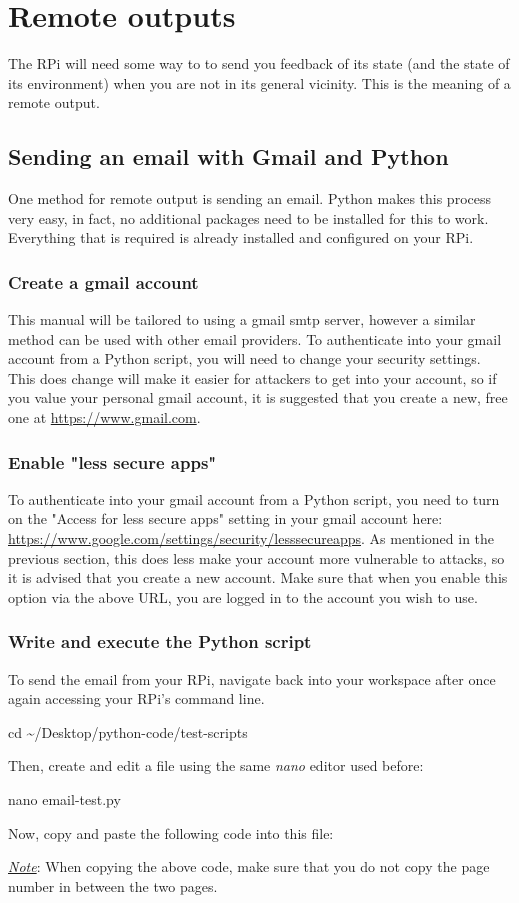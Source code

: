 \documentclass{article}
\newcommand*{\myfont}{\fontfamily{pcr}\selectfont}
\newcommand{\codeb}[2]{
  \begin{tcolorbox}[width=\textwidth,colback={SpringGreen},title={#1},colbacktitle=DarkGreen,coltitle=SpringGreen]
    \myfont
    #2
  \end{tcolorbox}
} %
\newcommand{\note}[1]{\underline{\textit{Note}}: #1}
\begin{document}
\section{Remote outputs}
The RPi will need some way to to send you feedback of its state (and the state of its environment) when you are not in its general vicinity. This is the meaning of a remote output.
  \subsection{Sending an email with Gmail and Python}
  One method for remote output is sending an email. Python makes this process very easy, in fact, no additional packages need to be installed for this to work. Everything that is required is already installed and configured on your RPi.
    \subsubsection{Create a gmail account}
    This manual will be tailored to using a gmail smtp server, however a similar method can be used with other email providers. To authenticate into your gmail account from a Python script, you will need to change your security settings. This does change will make it easier for attackers to get into your account, so if you value your personal gmail account, it is suggested that you create a new, free one at \href{https://www.gmail.com}{https://www.gmail.com}.
    \subsubsection{Enable "less secure apps"}
    To authenticate into your gmail account from a Python script, you need to turn on the "Access for less secure apps" setting in your gmail account here: \href{https://www.google.com/settings/security/lesssecureapps}{https://www.google.com/settings/security/lesssecureapps}. As mentioned in the previous section, this does less make your account more vulnerable to attacks, so it is advised that you create a new account. Make sure that when you enable this option via the above URL, you are logged in to the account you wish to use.
    \subsubsection{Write and execute the Python script}
    To send the email from your RPi, navigate back into your workspace after once again accessing your RPi's command line.
    \codeb{Navigate to your workspace}
    {
      cd \textasciitilde/Desktop/python-code/test-scripts
    }
    Then, create and edit a file using the same \textit{nano} editor used before:
    \codeb{Create email Python testing script file}
    {
      nano email-test.py
    }
    Now, copy and paste the following code into this file:
    
    \note{When copying the above code, make sure that you do not copy the page number in between the two pages.}
\end{document}
